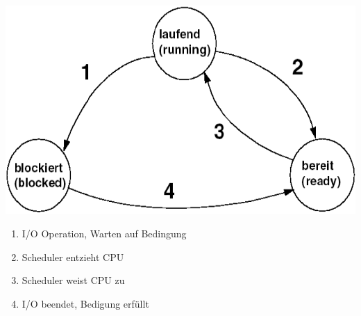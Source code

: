 \begin{minipage}[t]{0.45\columnwidth}
    \includegraphics[width=\columnwidth, align=t]{images/posix_process_states.png}
\end{minipage}
\hfill
\begin{minipage}[t]{0.5\columnwidth}
    \begin{enumerate}
        \item I/O Operation, Warten auf Bedingung
        \item Scheduler entzieht CPU
        \item Scheduler weist CPU zu
        \item I/O beendet, Bedigung erfüllt
    \end{enumerate}
\end{minipage}

\vspace{0.2cm}

